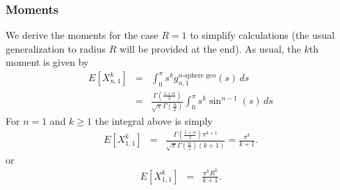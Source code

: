 \subsubsection{Moments}

We derive the moments for the case $R=1$ to simplify calculations
(the usual generalization to radius $R$ will be provided at the
end). As usual, the $k$th moment is given by
\begin{eqnarray}
 E[X_{n,1}^k] & = & \int_0^{\pi} 
                    s^k g_{n,1}^{n\mbox{-sphere geo}}(s)
                   \, ds \nonumber \\
      & = & \frac{\Gamma\left(\frac{1+n}{2}\right) }
                 {\sqrt{\pi } \Gamma\left(\frac{n}{2}\right)}
            \int_0^{\pi} 
                    s^k  \sin^{n-1}(s)
                   \, ds
  \label{eq:kth_moment_nsphere_geo}
\end{eqnarray}
For $n=1$ and $k \geq 1$ the integral above is simply
\begin{eqnarray}
 E[X_{1,1}^k] & = & \frac{\Gamma\left(\frac{1+n}{2}\right) \pi^{k+1}}
                 { \sqrt{\pi } \Gamma\left(\frac{n}{2}\right) (k+1)}
        = \frac{\pi^{k}}{k+1}.
\end{eqnarray}
or 
\begin{eqnarray}
 E[X_{1,1}^k] & = &  \frac{\pi^{k} R^k}{k+1}.
\end{eqnarray}

